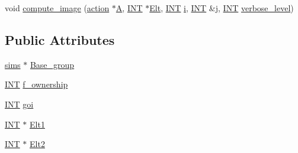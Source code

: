 \begin{DoxyCompactItemize}
\item 
void \mbox{\hyperlink{classaction__by__right__multiplication_a5407ada4c7d5a1775144fbaadbb8be8e}{compute\+\_\+image}} (\mbox{\hyperlink{classaction}{action}} $\ast$\mbox{\hyperlink{simeon_8_c_a97833f04c3a9c008df5521a2fc291bb4}{A}}, \mbox{\hyperlink{galois_8h_a09fddde158a3a20bd2dcadb609de11dc}{I\+NT}} $\ast$\mbox{\hyperlink{simeon_8_c_aec1406935bdb1fee3561fcb840964100}{Elt}}, \mbox{\hyperlink{galois_8h_a09fddde158a3a20bd2dcadb609de11dc}{I\+NT}} \mbox{\hyperlink{alphabet2_8_c_acb559820d9ca11295b4500f179ef6392}{i}}, \mbox{\hyperlink{galois_8h_a09fddde158a3a20bd2dcadb609de11dc}{I\+NT}} \&\mbox{\hyperlink{alphabet2_8_c_a37d972ae0b47b9099e30983131d31916}{j}}, \mbox{\hyperlink{galois_8h_a09fddde158a3a20bd2dcadb609de11dc}{I\+NT}} \mbox{\hyperlink{simeon_8_c_a818073fbcc2f439e7c56952f67386122}{verbose\+\_\+level}})
\end{DoxyCompactItemize}
\subsection*{Public Attributes}
\begin{DoxyCompactItemize}
\item 
\mbox{\hyperlink{classsims}{sims}} $\ast$ \mbox{\hyperlink{classaction__by__right__multiplication_a53daa3238df29627e3054e1e9257f9bb}{Base\+\_\+group}}
\item 
\mbox{\hyperlink{galois_8h_a09fddde158a3a20bd2dcadb609de11dc}{I\+NT}} \mbox{\hyperlink{classaction__by__right__multiplication_a0311dcdd5acad535093907b644cf3966}{f\+\_\+ownership}}
\item 
\mbox{\hyperlink{galois_8h_a09fddde158a3a20bd2dcadb609de11dc}{I\+NT}} \mbox{\hyperlink{classaction__by__right__multiplication_a1a494eebe67e491ada8973cc68a949ad}{goi}}
\item 
\mbox{\hyperlink{galois_8h_a09fddde158a3a20bd2dcadb609de11dc}{I\+NT}} $\ast$ \mbox{\hyperlink{classaction__by__right__multiplication_ab91d425ee3d09e6a77daeaa9f930a85f}{Elt1}}
\item 
\mbox{\hyperlink{galois_8h_a09fddde158a3a20bd2dcadb609de11dc}{I\+NT}} $\ast$ \mbox{\hyperlink{classaction__by__right__multiplication_abf4425cbc64b3f0af8f8bff276b47cba}{Elt2}}
\end{DoxyCompactItemize}
